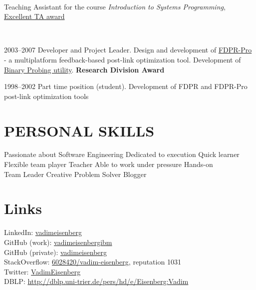 \documentclass[]{deedy-resume}
\begin{document}
\begin{minipage}[t]{0.66\textwidth}
 \\
\vspace{\topsep} %
Teaching Assistant for the course \textit{Introduction to Systems Programming}, \href{http://www.cs.technion.ac.il/news/2010/384/}{Excellent TA award}
\sectionsep

 \\
\vspace{\topsep} %
\begin{tightemize}
\item 2003--2007 Developer and Project Leader. Design and development of \href{http://www.haifa.il.ibm.com/projects/systems/cot/fdpr/}{FDPR-Pro} - a multiplatform feedback-based post-link optimization tool. Development of \href{https://www.research.ibm.com/haifa/projects/systems/cot/bprober/index.html}{Binary Probing utility}. \textbf{Research Division Award}
\item  1998--2002 Part time position (student). Development of FDPR and FDPR-Pro post-link optimization tools
\end{tightemize}
\sectionsep


\section{PERSONAL SKILLS}
Passionate about Software Engineering \textbullet{} Dedicated to execution \textbullet{}  Quick learner\\
Flexible team player \textbullet{} Teacher \textbullet{}  Able to work under pressure \textbullet{} Hands-on \\
Team Leader \textbullet{} Creative Problem Solver \textbullet{} Blogger

\section{Links}
LinkedIn:  \href{https://www.linkedin.com/in/vadimeisenberg}{vadimeisenberg} \\
GitHub (work): \href{https://github.com/vadimeisenbergibm}{vadimeisenbergibm} \\
GitHub (private): \href{https://github.com/vadimeisenberg}{vadimeisenberg} \\
StackOverflow: \href{http://stackoverflow.com/users/6028420/vadim-eisenberg}{6028420/vadim-eisenberg}, reputation 1031 \\
Twitter: \href{https://twitter.com/VadimEisenberg}{VadimEisenberg} \\
DBLP: \href{http://dblp.uni-trier.de/pers/hd/e/Eisenberg:Vadim}{http://dblp.uni-trier.de/pers/hd/e/Eisenberg:Vadim} \\


\end{minipage}
\end{document}
